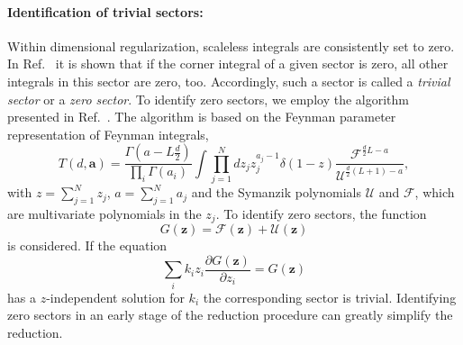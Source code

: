 \documentclass[a4paper,12pt]{scrartcl}
\newcommand*{\bm}{\boldsymbol}
\begin{document}
\paragraph{Identification of trivial sectors:}
Within dimensional regularization, scaleless integrals are consistently set to
zero. In Ref.~\cite{Lee:2012cn} it is shown that if the corner integral of a
given sector is zero, all other integrals in this sector are zero, too.
Accordingly, such a sector is called a \textit{trivial sector} or a \textit{zero
sector}. To identify zero sectors, we employ the algorithm presented in
Ref.~\cite{Lee:2013mka}. The algorithm is based on the Feynman parameter
representation of Feynman integrals,
\begin{equation}
  T(d,\bm{a}) =
  \frac{\Gamma(a - L\frac{d}{2})}{\prod_i\Gamma(a_i)}
  \int \prod_{j=1}^{N} dz_j z_j^{a_j-1}\delta(1-z)
  \frac{\mathcal{F}^{\frac{d}{2}  L-a}}{\mathcal{U}^{{\frac{d}{2}}(L+1) - a}},
\end{equation}
with $z=\sum_{j=1}^N z_j$, $a=\sum_{j=1}^N a_j$ and the Symanzik polynomials
$\mathcal{U}$ and $\mathcal{F}$, which are multivariate polynomials in the
$z_j$. To identify zero sectors, the function
\begin{equation}
  G(\bm{z}) = \mathcal{F}(\bm{z}) + \mathcal{U}(\bm{z})
  \label{eq:G-polynom}
\end{equation}
is considered. If the equation
\begin{equation}
  \sum_i k_i z_i \frac{\partial G(\bm{z})}{ \partial z_i} = G(\bm{z})
\end{equation}
has a $z$-independent solution for $k_i$ the corresponding sector is trivial.
Identifying zero sectors in an early stage of the reduction procedure can
greatly simplify the reduction.
\end{document}
